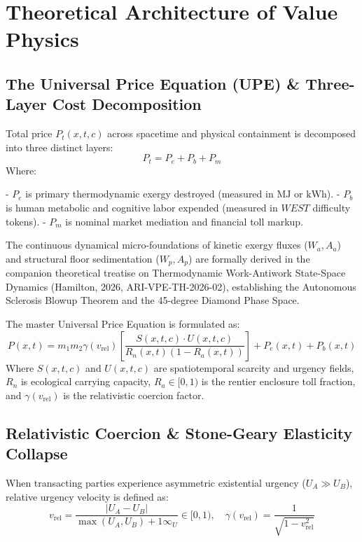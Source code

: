 \documentclass[preprint,12pt,authoryear]{elsarticle}
\theoremstyle{definition}
\begin{document}
\section{Theoretical Architecture of Value Physics}

\subsection{The Universal Price Equation (UPE) \& Three-Layer Cost Decomposition}

Total price $P_t(x, t, c)$ across spacetime and physical containment is decomposed into three distinct layers:  
$$P_t = P_e + P_b + P_m$$  
Where:

  

  - $P_e$ is primary thermodynamic exergy destroyed (measured in $\text{MJ}$ or $\text{kWh}$).
  - $P_b$ is human metabolic and cognitive labor expended (measured in $WEST$ difficulty tokens).
  - $P_m$ is nominal market mediation and financial toll markup.

  

The continuous dynamical micro-foundations of kinetic exergy fluxes ($W_a, A_a$) and structural floor sedimentation ($W_p, A_p$) are formally derived in the companion theoretical treatise on Thermodynamic Work-Antiwork State-Space Dynamics (Hamilton, 2026, ARI-VPE-TH-2026-02), establishing the Autonomous Sclerosis Blowup Theorem and the 45-degree Diamond Phase Space.

The master Universal Price Equation is formulated as:  
$$P(x, t) = m_1 m_2 \gamma(v_{\text{rel}}) \left[ \frac{S(x, t, c) \cdot U(x, t, c)}{R_n(x, t)(1 - R_a(x, t))} \right] + P_e(x, t) + P_b(x, t)$$  
Where $S(x, t, c)$ and $U(x, t, c)$ are spatiotemporal scarcity and urgency fields, $R_n$ is ecological carrying capacity, $R_a \in [0, 1)$ is the rentier enclosure toll fraction, and $\gamma(v_{\text{rel}})$ is the relativistic coercion factor.

\subsection{Relativistic Coercion \& Stone-Geary Elasticity Collapse}

When transacting parties experience asymmetric existential urgency ($U_A \gg U_B$), relative urgency velocity is defined as:  
$$v_{\text{rel}} = \frac{|U_A - U_B|}{\max(U_A, U_B) + 1\infty_U} \in [0, 1), \quad \gamma(v_{\text{rel}}) = \frac{1}{\sqrt{1 - v_{\text{rel}}^2}}$$
\end{document}
